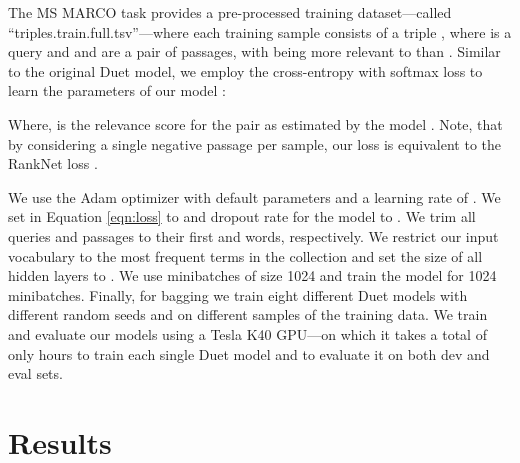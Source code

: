 \documentclass{article}
\begin{document}
The MS MARCO task provides a pre-processed training dataset---called ``triples.train.full.tsv''---where each training sample consists of a triple , where  is a query and  and  are a pair of passages, with  being more relevant to  than .
Similar to the original Duet model, we employ the cross-entropy with softmax loss to learn the parameters of our model :



Where,  is the relevance score for the pair  as estimated by the model .
Note, that by considering a single negative passage per sample, our loss is equivalent to the RankNet loss \citep{burges2005learning}.

We use the Adam optimizer with default parameters and a learning rate of .
We set  in Equation \ref{eqn:loss} to  and dropout rate for the model to .
We trim all queries and passages to their first  and  words, respectively.
We restrict our input vocabulary to the  most frequent terms in the collection and set the size of all hidden layers to .
We use minibatches of size 1024 and train the model for 1024 minibatches.
Finally, for bagging we train eight different Duet models with different random seeds and on different samples of the training data.
We train and evaluate our models using a Tesla K40 GPU---on which it takes a total of only  hours to train each single Duet model and to evaluate it on both dev and eval sets.




 \section{Results}
\label{sec:result}
\end{document}
